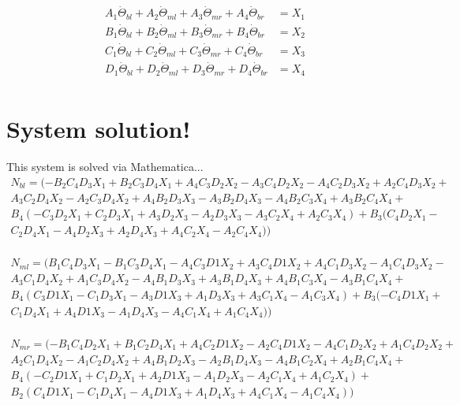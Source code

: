 \documentclass[11pt, landscape]{article}
\begin{document}
\begin{align}
  A_1\dot{\Theta}_{bl} + A_2 \dot{\Theta}_{ml} + A_3 \dot{\Theta}_{mr} + A_4 \dot{\Theta}_{br} &= X_1 \\
  B_1\dot{\Theta}_{bl} + B_2 \dot{\Theta}_{ml} + B_3 \dot{\Theta}_{mr} + B_4 \dot{\Theta}_{br} &= X_2 \\
  C_1\dot{\Theta}_{bl} + C_2 \dot{\Theta}_{ml} + C_3 \dot{\Theta}_{mr} + C_4 \dot{\Theta}_{br} &= X_3 \\
  D_1\dot{\Theta}_{bl} + D_2 \dot{\Theta}_{ml} + D_3 \dot{\Theta}_{mr} + D_4 \dot{\Theta}_{br} &= X_4 \\
\end{align}

\section{System solution!}
This system is solved via Mathematica...\\
\begin{multline}
N_{bl} =
(-B_2 C_4 D_3 X_1 + B_2 C_3 D_4 X_1 + A_4 C_3 D_2 X_2 - A_3 C_4 D_2 X_2 - A_4 C_2 D_3 X_2 + A_2 C_4 D_3 X_2 +\\
 A_3 C_2 D_4 X_2 - A_2 C_3 D_4 X_2 + A_4 B_2 D_3 X_3 - A_3 B_2 D_4 X_3 - A_4 B_2 C_3 X_4 + A_3 B_2 C_4 X_4 +\\
B_4 (-C_3 D_2 X_1 + C_2 D_3 X_1 + A_3 D_2 X_3 - A_2 D_3 X_3 - A_3 C_2 X_4 + A_2 C_3 X_4) + B_3 (C_4 D_2 X_1 - \\
C_2 D_4 X_1 - A_4 D_2 X_3 + A_2 D_4 X_3 + A_4 C_2 X_4 - A_2 C_4 X_4)) \\
\end{multline}

\begin{multline}
N_{ml} =
(B_1 C_4 D_3 X_1 - B_1 C_3 D_4 X_1 - A_4 C_3 D1 X_2 + A_3 C_4 D1 X_2 + A_4 C_1 D_3 X_2 - A_1 C_4 D_3 X_2 - \\
A_3 C_1 D_4 X_2 + A_1 C_3 D_4 X_2 - A_4 B_1 D_3 X_3 + A_3 B_1 D_4 X_3 + A_4 B_1 C_3 X_4 - A_3 B_1 C_4 X_4 +\\
B_4 (C_3 D1 X_1 - C_1 D_3 X_1 - A_3 D1 X_3 + A_1 D_3 X_3 + A_3 C_1 X_4 - A_1 C_3 X_4) + B_3 (-C_4 D1 X_1 + \\
C_1 D_4 X_1 + A_4 D1 X_3 - A_1 D_4 X_3 - A_4 C_1 X_4 + A_1 C_4 X_4)) \\
\end{multline}

\begin{multline}
N_{mr} =
(-B_1 C_4 D_2 X_1 + B_1 C_2 D_4 X_1 + A_4 C_2 D1 X_2 - A_2 C_4 D1 X_2 - A_4 C_1 D_2 X_2 + A_1 C_4 D_2 X_2 + \\
A_2 C_1 D_4 X_2 - A_1 C_2 D_4 X_2 + A_4 B_1 D_2 X_3 - A_2 B_1 D_4 X_3 - A_4 B_1 C_2 X_4 + A_2 B_1 C_4 X_4 +\\
B_4 (-C_2 D1 X_1 + C_1 D_2 X_1 + A_2 D1 X_3 - A_1 D_2 X_3 - A_2 C_1 X_4 + A_1 C_2 X_4) + \\
B_2 (C_4 D1 X_1 - C_1 D_4 X_1 - A_4 D1 X_3 + A_1 D_4 X_3 + A_4 C_1 X_4 - A_1 C_4 X_4)) \\
\end{multline}
\end{document}
